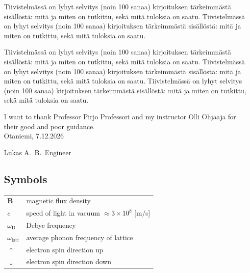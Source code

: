 \documentclass[english,12pt,a4paper,pdftex,elec,utf8]{aaltothesis}
\begin{document}
\begin{abstractpage}[finnish]
  Tiivistelmässä on lyhyt selvitys (noin 100 sanaa)
  kirjoituksen tärkeimmästä sisällöstä: mitä ja miten on tutkittu,
  sekä mitä tuloksia on saatu. 
  Tiivistelmässä on lyhyt selvitys (noin 100 sanaa)
  kirjoituksen tärkeimmästä sisällöstä: mitä ja miten on tutkittu,
  sekä mitä tuloksia on saatu. 

  Tiivistelmässä on lyhyt selvitys (noin 100 sanaa)
  kirjoituksen tärkeimmästä sisällöstä: mitä ja miten on tutkittu,
  sekä mitä tuloksia on saatu. 
  Tiivistelmässä on lyhyt selvitys (noin 100 sanaa)
  kirjoituksen tärkeimmästä sisällöstä: mitä ja miten on tutkittu,
  sekä mitä tuloksia on saatu. 
  Tiivistelmässä on lyhyt selvitys (noin 100 sanaa)
  kirjoituksen tärkeimmästä sisällöstä: mitä ja miten on tutkittu,
  sekä mitä tuloksia on saatu. 
\end{abstractpage}


I want to thank Professor Pirjo Professori
and my instructor Olli Ohjaaja for their 
good and poor guidance.\\

\vspace{5cm}
Otaniemi, 7.12.2026

\vspace{5mm}
{\hfill Lukas A.\ B.\ Engineer \hspace{1cm}}

\newpage


\thesistableofcontents



\subsection*{Symbols}

\begin{tabular}{ll}
$\mathbf{B}$  & magnetic flux density  \\
$c$              & speed of light in vacuum $\approx 3\times10^8$ [m/s]\\
$\omega_{\mathrm{D}}$    & Debye frequency \\
$\omega_{\mathrm{latt}}$ & average phonon frequency of lattice \\
$\uparrow$       & electron spin direction up\\
$\downarrow$     & electron spin direction down
\end{tabular}
\end{document}
